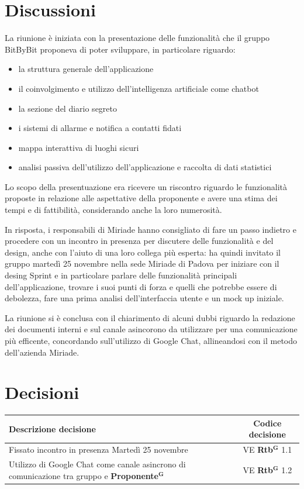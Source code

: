 \documentclass[a4paper,12pt]{article}
\newcommand{\term}[1]{\textbf{#1}$^\mathbf{G}$}
\begin{document}
	\section{Discussioni}
	La riunione \`e iniziata con la presentazione delle funzionalit\`a che il gruppo BitByBit proponeva di poter sviluppare, in particolare riguardo:
	\begin{itemize}
		\item la struttura generale dell'applicazione
		\item il coinvolgimento e utilizzo dell'intelligenza artificiale come chatbot
		\item la sezione del diario segreto
		\item i sistemi di allarme e notifica a contatti fidati
		\item mappa interattiva di luoghi sicuri
		\item analisi passiva dell'utilizzo dell'applicazione e raccolta di dati statistici
	\end{itemize}
	Lo scopo della presentuazione era ricevere un riscontro riguardo le funzionalità proposte in relazione alle aspettative della proponente e avere una stima dei tempi e di fattibilit\`a, considerando anche la loro numerosit\`a.
	
	In risposta, i responsabili di Miriade hanno consigliato di fare un passo indietro e procedere con un incontro in presenza per discutere delle funzionalità e del design, anche con l'aiuto di una loro collega pi\`u esperta: ha quindi invitato il gruppo marted\`i  25 novembre nella sede Miriade di Padova per iniziare con il desing Sprint e in particolare parlare delle funzionalit\`a principali dell'applicazione, trovare i suoi punti di forza e quelli che potrebbe essere di debolezza, fare una prima analisi dell'interfaccia utente e un mock up iniziale.
	
	La riunione si \`e conclusa con il chiarimento di alcuni dubbi riguardo la redazione dei documenti interni e sul canale asincorono da utilizzare per una comunicazione pi\`u efficente, concordando sull'utilizzo di Google Chat, allineandosi con il metodo dell'azienda Miriade.
	
	
	\section{Decisioni}
	\begin{center}
		\small
		\renewcommand{\arraystretch}{1.2} 
		\begin{tabular}{|p{}|c|}
			\hline
			\rowcolor{gray!60} 
			\textbf{Descrizione decisione} & \textbf{Codice decisione} \\
			\hline
			\rowcolor{white}
			Fissato incontro in presenza Marted\`i 25 novembre & VE \term{Rtb} 1.1 \\
			\hline
			\rowcolor{gray!20}
			Utilizzo di Google Chat come canale asincrono di comunicazione tra gruppo e \term{Proponente} &  VE \term{Rtb} 1.2 \\
			\hline
		\end{tabular}
	\end{center}
	
\end{document}

